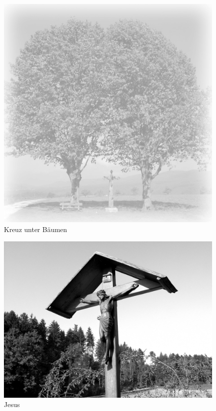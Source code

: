 \documentclass[ngerman,a4paper,11pt]{scrreprt}
\begin{document}
\begin{figure}[H]
\centering
\includegraphics[width=\textwidth,height=.8\textheight,keepaspectratio]{Bilder/Bilder/750_0010_18433_1161980_Hintergrund_Baeume_und_Kreuz.png}
\caption{\label{img_Kreuz_unter_Baeume}Kreuz unter Bäumen}
\end{figure}

\begin{figure}[H]
\centering
\includegraphics[width=\textwidth,height=.8\textheight,keepaspectratio]{Bilder/Bilder/750_0010_25344_Jesus_am_Holzkreuz.png}
\caption{\label{img_Jesus}Jesus}
\end{figure}
\end{document}
